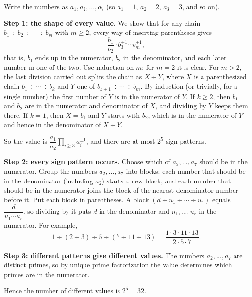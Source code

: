 Write the numbers as $a_1,a_2,\dots,a_{7}$ (so $a_1=1$, $a_2=2$, $a_3=3$, and so on).

\textbf{Step 1: the shape of every value.} We show that for any chain $b_1\div b_2\div\cdots\div b_m$ with $m\ge2$, every way of inserting parentheses gives
\[
\dfrac{b_1}{b_2}\cdot b_3^{\pm1}\cdots b_m^{\pm1},
\]
that is, $b_1$ ends up in the numerator, $b_2$ in the denominator, and each later number in one of the two. Use induction on $m$; for $m=2$ it is clear. For $m>2$, the last division carried out splits the chain as $X\div Y$, where $X$ is a parenthesized chain $b_1\div\cdots\div b_k$ and $Y$ one of $b_{k+1}\div\cdots\div b_m$. By induction (or trivially, for a single number) the first number of $Y$ is in the numerator of $Y$. If $k\ge2$, then $b_1$ and $b_2$ are in the numerator and denominator of $X$, and dividing by $Y$ keeps them there. If $k=1$, then $X=b_1$ and $Y$ starts with $b_2$, which is in the numerator of $Y$ and hence in the denominator of $X\div Y$.

So the value is $\dfrac{a_1}{a_2}\prod_{i\ge3}a_i^{\pm1}$, and there are at most $2^{5}$ sign patterns.

\textbf{Step 2: every sign pattern occurs.} Choose which of $a_3,\dots,a_{7}$ should be in the numerator. Group the numbers $a_2,\dots,a_{7}$ into blocks: each number that should be in the denominator (including $a_2$) starts a new block, and each number that should be in the numerator joins the block of the nearest denominator number before it. Put each block in parentheses. A block $(d\div u_1\div\cdots\div u_r)$ equals $\dfrac{d}{u_1\cdots u_r}$, so dividing by it puts $d$ in the denominator and $u_1,\dots,u_r$ in the numerator. For example,
\[
1\div(2\div3)\div5\div(7\div11\div13)=\dfrac{1\cdot3\cdot11\cdot13}{2\cdot5\cdot7} .
\]

\textbf{Step 3: different patterns give different values.} The numbers $a_2,\dots,a_{7}$ are distinct primes, so by unique prime factorization the value determines which primes are in the numerator.

Hence the number of different values is $2^{5}=\boxed{32}$.
